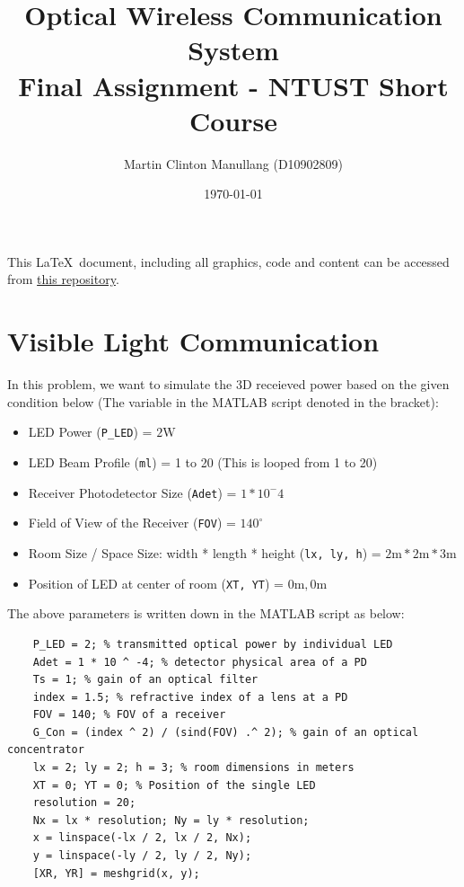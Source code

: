 \documentclass[12pt]{article}
\begin{document}
\title{Optical Wireless Communication System \\ \large{Final Assignment - NTUST Short Course}}
\author{Martin Clinton Manullang (D10902809)}
\date{\today}
\maketitle

This \LaTeX\  document, including all graphics, code and content can be accessed from \href{https://github.com/mctosima/OWC-NottinghamNTUST-FinalAssignment/tree/main}{this repository}.

\section{Visible Light Communication}
	In this problem, we want to simulate the 3D receieved power based on the given condition below (The variable in the MATLAB script denoted in the bracket):
    \begin{itemize}
        \item LED Power (\texttt{P\_LED}) = $2 \text{W}$
        \item LED Beam Profile (\texttt{ml}) = 1 to 20 (This is looped from 1 to 20)
        \item Receiver Photodetector Size (\texttt{Adet}) = $1 * 10^-{4}$
        \item Field of View of the Receiver (\texttt{FOV}) = $140^\circ$
        \item Room Size / Space Size: width * length * height (\texttt{lx, ly, h}) = $2 \text{m} * 2 \text{m} * 3 \text{m}$
        \item Position of LED at center of room (\texttt{XT, YT}) = $0 \text{m} , 0 \text{m}$
    \end{itemize}

    The above parameters is written down in the MATLAB script as below:

    \begin{lstlisting}
    P_LED = 2; % transmitted optical power by individual LED
    Adet = 1 * 10 ^ -4; % detector physical area of a PD
    Ts = 1; % gain of an optical filter
    index = 1.5; % refractive index of a lens at a PD
    FOV = 140; % FOV of a receiver
    G_Con = (index ^ 2) / (sind(FOV) .^ 2); % gain of an optical concentrator
    lx = 2; ly = 2; h = 3; % room dimensions in meters
    XT = 0; YT = 0; % Position of the single LED
    resolution = 20;
    Nx = lx * resolution; Ny = ly * resolution;
    x = linspace(-lx / 2, lx / 2, Nx);
    y = linspace(-ly / 2, ly / 2, Ny);
    [XR, YR] = meshgrid(x, y);
    \end{lstlisting}
\end{document}
